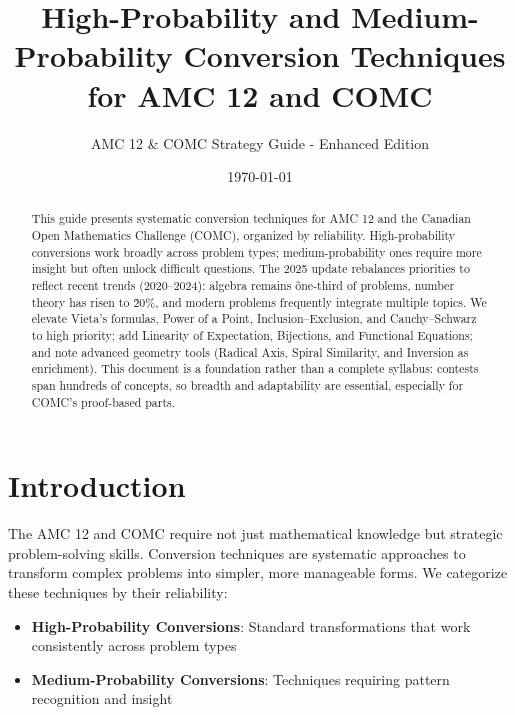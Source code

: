 \documentclass[12pt]{article}
\title{\textbf{High-Probability and Medium-Probability Conversion Techniques for AMC 12 and COMC}}
\author{AMC 12 \& COMC Strategy Guide - Enhanced Edition}
\date{\today}
\begin{document}
\maketitle

\begin{abstract}
This guide presents systematic conversion techniques for AMC 12 and the Canadian Open Mathematics Challenge (COMC), organized by reliability. High-probability conversions work broadly across problem types; medium-probability ones require more insight but often unlock difficult questions. The 2025 update rebalances priorities to reflect recent trends (2020--2024): algebra remains \~one-third of problems, number theory has risen to \~20\%, and modern problems frequently integrate multiple topics. We elevate Vieta's formulas, Power of a Point, Inclusion–Exclusion, and Cauchy–Schwarz to high priority; add Linearity of Expectation, Bijections, and Functional Equations; and note advanced geometry tools (Radical Axis, Spiral Similarity, and Inversion as enrichment). This document is a foundation rather than a complete syllabus: contests span hundreds of concepts, so breadth and adaptability are essential, especially for COMC's proof-based parts.
\end{abstract}

\tableofcontents
\newpage

\section{Introduction}

The AMC 12 and COMC require not just mathematical knowledge but strategic problem-solving skills. Conversion techniques are systematic approaches to transform complex problems into simpler, more manageable forms. We categorize these techniques by their reliability:

\begin{itemize}
    \item \textbf{High-Probability Conversions}: Standard transformations that work consistently across problem types
    \item \textbf{Medium-Probability Conversions}: Techniques requiring pattern recognition and insight
\end{itemize}
\end{document}
